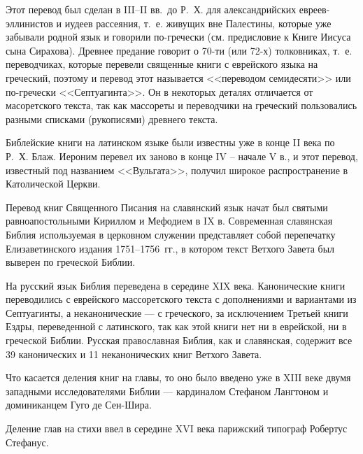 Этот перевод был сделан в III--II вв.~до Р.~Х. для александрийских
евреев-эллинистов и иудеев рассеяния, т.~е. живущих вне Палестины, которые
уже забывали родной язык и говорили по-гречески
(см. предисловие к Книге Иисуса сына Сирахова).
Древнее предание говорит о 70-ти (или 72-х) толковниках, т.~е. переводчиках,
которые перевели священные книги с еврейского языка на греческий, поэтому и
перевод этот называется <<переводом семидесяти>> или по-гречески <<Септуагинта>>.
Он в некоторых деталях отличается от масоретского текста, так как массореты и
переводчики на греческий пользовались разными списками (рукописями) древнего текста.

Библейские книги на латинском языке были известны уже в конце II века по Р.~Х.
Блаж. Иероним перевел их заново в конце IV -- начале V в., и этот перевод, известный
под названием <<Вульгата>>, получил широкое распространение в Католической Церкви.

Перевод книг Священного Писания на славянский язык начат был святыми равноапостольными Кириллом
и Мефодием в IX в.
Современная славянская Библия используемая в церковном служении представляет собой
перепечатку Елизаветинского издания 1751--1756~гг., в котором текст Ветхого Завета
был выверен по греческой Библии.

На русский язык Библия переведена в середине XIX века.
Канонические книги переводились с еврейского массоретского текста с
дополнениями и вариантами из Септуагинты, а неканонические --- с греческого,
за исключением Третьей книги Ездры, переведенной с латинского, так как этой
книги нет ни в еврейской, ни в греческой Библии.
Русская православная Библия, как и славянская, содержит все 39 канонических и
11 неканонических книг Ветхого Завета.

Что касается деления книг на главы, то оно было введено уже в XIII веке
двумя западными исследователями Библии --- кардиналом Стефаном Лангтоном и
доминиканцем Гуго де Сен-Шира.

Деление глав на стихи ввел в середине XVI века парижский типограф
Робертус Стефанус. 
